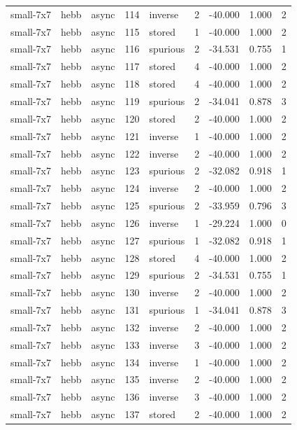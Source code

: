 \begin{tabular}{lllrlrrrr}
small-7x7 & hebb & async & 114 & inverse & 2 & -40.000 & 1.000 & 2 \\
small-7x7 & hebb & async & 115 & stored & 1 & -40.000 & 1.000 & 2 \\
small-7x7 & hebb & async & 116 & spurious & 2 & -34.531 & 0.755 & 1 \\
small-7x7 & hebb & async & 117 & stored & 4 & -40.000 & 1.000 & 2 \\
small-7x7 & hebb & async & 118 & stored & 4 & -40.000 & 1.000 & 2 \\
small-7x7 & hebb & async & 119 & spurious & 2 & -34.041 & 0.878 & 3 \\
small-7x7 & hebb & async & 120 & stored & 2 & -40.000 & 1.000 & 2 \\
small-7x7 & hebb & async & 121 & inverse & 1 & -40.000 & 1.000 & 2 \\
small-7x7 & hebb & async & 122 & inverse & 2 & -40.000 & 1.000 & 2 \\
small-7x7 & hebb & async & 123 & spurious & 2 & -32.082 & 0.918 & 1 \\
small-7x7 & hebb & async & 124 & inverse & 2 & -40.000 & 1.000 & 2 \\
small-7x7 & hebb & async & 125 & spurious & 2 & -33.959 & 0.796 & 3 \\
small-7x7 & hebb & async & 126 & inverse & 1 & -29.224 & 1.000 & 0 \\
small-7x7 & hebb & async & 127 & spurious & 1 & -32.082 & 0.918 & 1 \\
small-7x7 & hebb & async & 128 & stored & 4 & -40.000 & 1.000 & 2 \\
small-7x7 & hebb & async & 129 & spurious & 2 & -34.531 & 0.755 & 1 \\
small-7x7 & hebb & async & 130 & inverse & 2 & -40.000 & 1.000 & 2 \\
small-7x7 & hebb & async & 131 & spurious & 1 & -34.041 & 0.878 & 3 \\
small-7x7 & hebb & async & 132 & inverse & 2 & -40.000 & 1.000 & 2 \\
small-7x7 & hebb & async & 133 & inverse & 3 & -40.000 & 1.000 & 2 \\
small-7x7 & hebb & async & 134 & inverse & 1 & -40.000 & 1.000 & 2 \\
small-7x7 & hebb & async & 135 & inverse & 2 & -40.000 & 1.000 & 2 \\
small-7x7 & hebb & async & 136 & inverse & 3 & -40.000 & 1.000 & 2 \\
small-7x7 & hebb & async & 137 & stored & 2 & -40.000 & 1.000 & 2 \\

\end{tabular}
